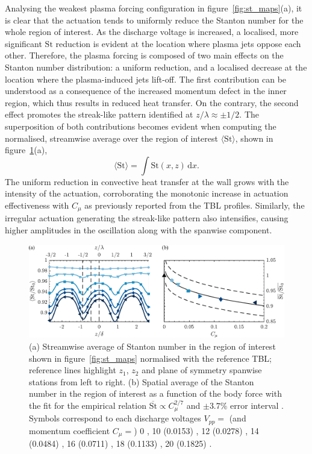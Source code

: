 Analysing the weakest plasma forcing configuration in figure~\ref{fig:st_maps}(a), it is clear that the actuation tends to uniformly reduce the Stanton number for the whole region of interest. As the discharge voltage is increased, a localised, more significant $\mathrm{St}$ reduction is evident at the location where plasma jets oppose each other. Therefore, the plasma forcing is composed of two main effects on the Stanton number distribution: a uniform reduction, and a localised decrease at the location where the plasma-induced jets lift-off. The first contribution can be understood as a consequence of the increased momentum defect in the inner region, which thus results in reduced heat transfer. On the contrary, the second effect promotes the streak-like pattern identified at $z/\lambda \approx \pm 1/2$. The superposition of both contributions becomes evident when computing the normalised, streamwise average over the region of interest $\langle \mathrm{St} \rangle$, shown in figure~\ref{fig:meanSt_delta}(a),
\begin{equation}
    	\langle \mathrm{St} \rangle = \int \mathrm{St}(x,z) \,\mathrm{d}x .
\end{equation}
The uniform reduction in convective heat transfer at the wall grows with the intensity of the actuation, corroborating the monotonic increase in actuation effectiveness with $C_\mu$ as previously reported from the TBL profiles. Similarly, the irregular actuation generating the streak-like pattern also intensifies, causing higher amplitudes in the oscillation along with the spanwise component.  
\begin{figure}
         \centering
         \includegraphics[width=0.99\linewidth]{figures/results/St/stz_v3_cmu.pdf}
         \caption{(a) Streamwise average of Stanton number in the region of interest shown in figure~\ref{fig:st_maps} normalised with the reference TBL; reference lines  highlight $z_1$, $z_2$ and plane of symmetry spanwise stations from left to right. (b) Spatial average of the Stanton number in the region of interest as a function of the body force with the fit for the empirical relation $\overline{\mathrm{St}} \propto C_\mu ^{2/7} $  and $\pm3.7\%$ error interval . Symbols correspond to each discharge voltages $V_{pp}=$ (and momentum coefficient $C_\mu = $) 0 , 10 (0.0153) , 12 (0.0278) , 14 (0.0484) , 16 (0.0711) , 18 (0.1133)
         , 20 (0.1825) .} \label{fig:meanSt_delta}
\end{figure}

